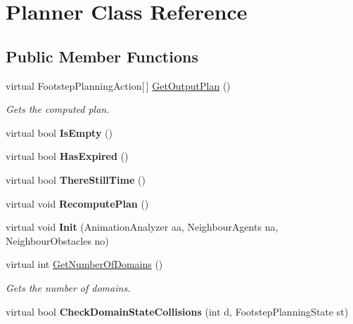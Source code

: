 \hypertarget{class_planner}{\section{Planner Class Reference}
\label{class_planner}
}
\subsection*{Public Member Functions}
\begin{DoxyCompactItemize}
\item 
virtual Footstep\-Planning\-Action\mbox{[}$\,$\mbox{]} \hyperlink{class_planner_a547ab7ac5131f9a7b1c21a2c0315a9a5}{Get\-Output\-Plan} ()
\begin{DoxyCompactList}\small\item\em Gets the computed plan. \end{DoxyCompactList}\item 
\hypertarget{class_planner_a524224551fd946ebbdd3ed63fe3a6403}{virtual bool {\bfseries Is\-Empty} ()}\label{class_planner_a524224551fd946ebbdd3ed63fe3a6403}

\item 
\hypertarget{class_planner_a45faf2988ce1bb00355579b2d1db6545}{virtual bool {\bfseries Has\-Expired} ()}\label{class_planner_a45faf2988ce1bb00355579b2d1db6545}

\item 
\hypertarget{class_planner_ad0954ae572578966463be213f396ed78}{virtual bool {\bfseries There\-Still\-Time} ()}\label{class_planner_ad0954ae572578966463be213f396ed78}

\item 
\hypertarget{class_planner_ae9528547234832c67b351e6800b94ff5}{virtual void {\bfseries Recompute\-Plan} ()}\label{class_planner_ae9528547234832c67b351e6800b94ff5}

\item 
\hypertarget{class_planner_a223b6149af3af1f6ba2e61e51e6dda87}{virtual void {\bfseries Init} (Animation\-Analyzer aa, Neighbour\-Agents na, Neighbour\-Obstacles no)}\label{class_planner_a223b6149af3af1f6ba2e61e51e6dda87}

\item 
virtual int \hyperlink{class_planner_acbe375938802581e5338e61145711ca0}{Get\-Number\-Of\-Domains} ()
\begin{DoxyCompactList}\small\item\em Gets the number of domains. \end{DoxyCompactList}\item 
\hypertarget{class_planner_ab8dcacec087454aec674af4380286bba}{virtual bool {\bfseries Check\-Domain\-State\-Collisions} (int d, Footstep\-Planning\-State st)}\label{class_planner_ab8dcacec087454aec674af4380286bba}


\end{DoxyCompactItemize}

